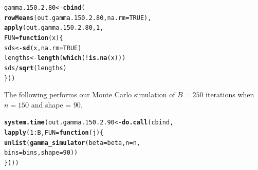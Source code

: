 \documentclass[11pt]{article}\usepackage[]{graphicx}\usepackage[]{color}
\makeatletter
\newcommand{\hlnum}[1]{\textcolor[rgb]{0.686,0.059,0.569}{#1}}%
\newcommand{\hlopt}[1]{\textcolor[rgb]{0,0,0}{#1}}%
\newcommand{\hlstd}[1]{\textcolor[rgb]{0.345,0.345,0.345}{#1}}%
\newcommand{\hlkwa}[1]{\textcolor[rgb]{0.161,0.373,0.58}{\textbf{#1}}}%
\newcommand{\hlkwb}[1]{\textcolor[rgb]{0.69,0.353,0.396}{#1}}%
\newcommand{\hlkwc}[1]{\textcolor[rgb]{0.333,0.667,0.333}{#1}}%
\newcommand{\hlkwd}[1]{\textcolor[rgb]{0.737,0.353,0.396}{\textbf{#1}}}%
\newenvironment{kframe}{%
 \def\at@end@of@kframe{}%
 \ifinner\ifhmode%
  \def\at@end@of@kframe{\end{minipage}}%
  \begin{minipage}{\columnwidth}%
 \fi\fi%
 \def\FrameCommand##1{\hskip\@totalleftmargin \hskip-\fboxsep
 \colorbox{shadecolor}{##1}\hskip-\fboxsep
     \hskip-\linewidth \hskip-\@totalleftmargin \hskip\columnwidth}%
 \MakeFramed {\advance\hsize-\width
   \@totalleftmargin\z@ \linewidth\hsize
   \@setminipage}}%
 {\par\unskip\endMakeFramed%
 \at@end@of@kframe}
\newenvironment{knitrout}{}{} %
\makeatother
\begin{document}
\begin{knitrout}
\color{fgcolor}\begin{kframe}
\begin{alltt}
\hlstd{gamma.150.2.80} \hlkwb{<-} \hlkwd{cbind}\hlstd{(}
  \hlkwd{rowMeans}\hlstd{(out.gamma.150.2.80,} \hlkwc{na.rm} \hlstd{=} \hlnum{TRUE}\hlstd{),}
  \hlkwd{apply}\hlstd{(out.gamma.150.2.80,} \hlnum{1}\hlstd{,}
  \hlkwc{FUN} \hlstd{=} \hlkwa{function}\hlstd{(}\hlkwc{x}\hlstd{)\{}
    \hlstd{sds} \hlkwb{<-} \hlkwd{sd}\hlstd{(x,} \hlkwc{na.rm} \hlstd{=} \hlnum{TRUE}\hlstd{)}
    \hlstd{lengths} \hlkwb{<-} \hlkwd{length}\hlstd{(}\hlkwd{which}\hlstd{(}\hlopt{!}\hlkwd{is.na}\hlstd{(x)))}
    \hlstd{sds} \hlopt{/} \hlkwd{sqrt}\hlstd{(lengths)}
  \hlstd{\}))}
\end{alltt}


{\ttfamily\noindent\bfseries\color{errorcolor}{\#\# Error in is.data.frame(x): object 'out.gamma.150.2.80' not found}}\end{kframe}
\end{knitrout}

The following performs our Monte Carlo simulation of $B = 250$ iterations 
when $n = 150$ and shape = $90$.

\begin{knitrout}
\color{fgcolor}\begin{kframe}
\begin{alltt}
\hlkwd{system.time}\hlstd{(out.gamma.150.2.90} \hlkwb{<-} \hlkwd{do.call}\hlstd{(cbind,}
  \hlkwd{lapply}\hlstd{(}\hlnum{1}\hlopt{:}\hlstd{B,} \hlkwc{FUN} \hlstd{=} \hlkwa{function}\hlstd{(}\hlkwc{j}\hlstd{)\{}
    \hlkwd{unlist}\hlstd{(}\hlkwd{gamma_simulator}\hlstd{(}\hlkwc{beta} \hlstd{= beta,} \hlkwc{n} \hlstd{= n,}
      \hlkwc{bins} \hlstd{= bins,} \hlkwc{shape} \hlstd{=} \hlnum{90}\hlstd{))}
\hlstd{\})))}
\end{alltt}


{\ttfamily\noindent\bfseries\color{errorcolor}{\#\# Error in eval(predvars, data, env): object 'x1' not found}}

{\ttfamily\noindent\itshape\color{messagecolor}{\#\# Timing stopped at: 0.002 0 0.003}}\end{kframe}
\end{knitrout}
\end{document}
